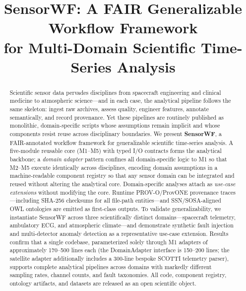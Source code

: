 \documentclass[conference]{IEEEtran}
\begin{document}
\title{SensorWF: A FAIR Generalizable Workflow Framework\\for Multi-Domain Scientific Time-Series Analysis}

\author{
}

\maketitle

\begin{abstract}
Scientific sensor data pervades disciplines from spacecraft engineering and clinical medicine to atmospheric science---and in each case, the analytical pipeline follows the same skeleton: ingest raw archives, assess quality, engineer features, annotate semantically, and record provenance. Yet these pipelines are routinely published as monolithic, domain-specific scripts whose assumptions remain implicit and whose components resist reuse across disciplinary boundaries. We present \textbf{SensorWF}, a FAIR-annotated workflow framework for generalizable scientific time-series analysis. A five-module reusable core (M1--M5) with typed I/O contracts forms the analytical backbone; a \emph{domain adapter} pattern confines all domain-specific logic to M1 so that M2--M5 execute identically across disciplines, encoding domain assumptions in a machine-readable component registry so that any sensor domain can be integrated and reused without altering the analytical core. Domain-specific analyses attach as \emph{use-case extensions} without modifying the core. Runtime PROV-O/ProvONE provenance traces---including SHA-256 checksums for all file-path entities---and SSN/SOSA-aligned OWL ontologies are emitted as first-class outputs. To validate generalizability, we instantiate SensorWF across three scientifically distinct domains---spacecraft telemetry, ambulatory ECG, and atmospheric climate---and demonstrate synthetic fault injection and multi-detector anomaly detection as a representative use-case extension. Results confirm that a single codebase, parameterized solely through M1 adapters of approximately 170--500 lines each (the DomainAdapter interface is 150--200 lines; the satellite adapter additionally includes a 300-line bespoke SCOTTI telemetry parser), supports complete analytical pipelines across domains with markedly different sampling rates, channel counts, and fault taxonomies. All code, component registry, ontology artifacts, and datasets are released as an open scientific object.
\end{abstract}
\end{document}
